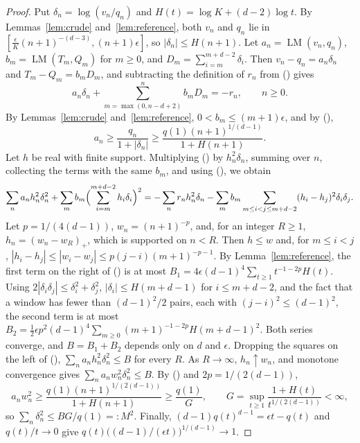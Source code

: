 \documentclass[twoside,10pt]{article}
\numberwithin{equation}{section}
\theoremstyle{slbody}
\theoremstyle{remark}
\renewcommand{\eqref}[1]{%
  \textup{{\normalfont(\oldstylenums{\ref{#1}}}\normalfont)}}
\begin{document}
\begin{proof}
Put \(\delta_n=\log(v_n/q_n)\) and \(H(t)=\log K+(d-2)\log t\).  By
Lemmas~\ref{lem:crude} and~\ref{lem:reference}, both \(v_n\) and \(q_n\)
lie in \([\frac\epsilon K(n+1)^{-(d-3)},(n+1)\epsilon]\), so
\(|\delta_n|\leq H(n+1)\).  Let \(a_n=\operatorname{LM}(v_n,q_n)\),
\(b_m=\operatorname{LM}(T_m,Q_m)\) for \(m\geq0\), and
\(D_m=\sum_{i=m}^{m+d-2}\delta_i\).  Then \(v_n-q_n=a_n\delta_n\) and
\(T_m-Q_m=b_mD_m\), and subtracting the definition of \(r_n\) from
\eqref{eq:integrated} gives
\begin{equation}
a_n\delta_n+\sum_{m=\max(0,n-d+2)}^{n}b_mD_m=-r_n,
\qquad n\geq0.
\label{eq:linearized}
\end{equation}
By Lemmas~\ref{lem:crude} and~\ref{lem:reference},
\(0<b_m\leq(m+1)\epsilon\), and by \eqref{eq:lm-lower},
\begin{equation}
a_n\geq\frac{q_n}{1+|\delta_n|}
\geq\frac{q(1)(n+1)^{1/(d-1)}}{1+H(n+1)} .
\label{eq:log-means}
\end{equation}
Let \(h\) be real with finite support.  Multiplying
\eqref{eq:linearized} by \(h_n^2\delta_n\), summing over \(n\), collecting
the terms with the same \(b_m\), and using \eqref{eq:square-identity}, we
obtain
\begin{equation}
\sum_na_nh_n^2\delta_n^2
+\sum_mb_m\Bigl(\sum_{i=m}^{m+d-2}h_i\delta_i\Bigr)^2
=-\sum_nr_nh_n^2\delta_n
-\sum_mb_m\sum_{m\leq i<j\leq m+d-2}(h_i-h_j)^2\delta_i\delta_j .
\label{eq:localized}
\end{equation}
Let \(p=1/(4(d-1))\), \(w_n=(n+1)^{-p}\), and, for an integer \(R\geq1\),
\(h_n=(w_n-w_R)_+\), which is supported on \(n<R\).  Then \(h\leq w\) and,
for \(m\leq i<j\), \(|h_i-h_j|\leq|w_i-w_j|\leq p(j-i)(m+1)^{-p-1}\).  By
Lemma~\ref{lem:reference}, the first term on the right of
\eqref{eq:localized} is at most
\(B_1=4\epsilon(d-1)^4\sum_{t\geq1}t^{-1-2p}H(t)\).  Using
\(2|\delta_i\delta_j|\leq\delta_i^2+\delta_j^2\), \(|\delta_i|\leq H(m+d-1)\)
for \(i\leq m+d-2\), and the fact that a window has fewer than
\((d-1)^2/2\) pairs, each with \((j-i)^2\leq(d-1)^2\), the second term is
at most
\(B_2=\frac12\epsilon p^2(d-1)^4\sum_{m\geq0}(m+1)^{-1-2p}H(m+d-1)^2\).
Both series converge, and \(B=B_1+B_2\) depends only on \(d\) and
\(\epsilon\).  Dropping the squares on the left of \eqref{eq:localized},
\(\sum_na_nh_n^2\delta_n^2\leq B\) for every \(R\).  As \(R\to\infty\),
\(h_n\uparrow w_n\), and monotone convergence gives
\(\sum_na_nw_n^2\delta_n^2\leq B\).  By \eqref{eq:log-means} and
\(2p=1/(2(d-1))\),
\[
a_nw_n^2\geq\frac{q(1)(n+1)^{1/(2(d-1))}}{1+H(n+1)}\geq\frac{q(1)}{G},
\qquad
G=\sup_{t\geq1}\frac{1+H(t)}{t^{1/(2(d-1))}}<\infty,
\]
so \(\sum_n\delta_n^2\leq BG/q(1)=:M^2\).  Finally,
\((d-1)q(t)^{d-1}=\epsilon t-q(t)\) and \(q(t)/t\to0\) give
\(q(t)\bigl((d-1)/(\epsilon t)\bigr)^{1/(d-1)}\to1\).
\end{proof}
\end{document}
